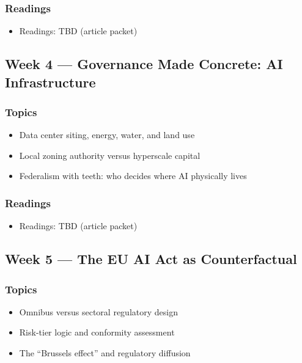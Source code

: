 \documentclass[12pt]{article}
\begin{document}
    \subsubsection*{Readings}
        \begin{itemize}
            \item Readings: TBD (article packet)
        \end{itemize}

\subsection*{Week 4 --- Governance Made Concrete: AI Infrastructure}
    \subsubsection*{Topics}
        \begin{itemize}
            \item Data center siting, energy, water, and land use
            \item Local zoning authority versus hyperscale capital
            \item Federalism with teeth: who decides where AI physically lives
        \end{itemize}
    \subsubsection*{Readings}
        \begin{itemize}
            \item Readings: TBD (article packet)
        \end{itemize}

\subsection*{Week 5 --- The EU AI Act as Counterfactual}
    \subsubsection*{Topics}
        \begin{itemize}
            \item Omnibus versus sectoral regulatory design
            \item Risk-tier logic and conformity assessment
            \item The ``Brussels effect'' and regulatory diffusion
        \end{itemize}
\end{document}
